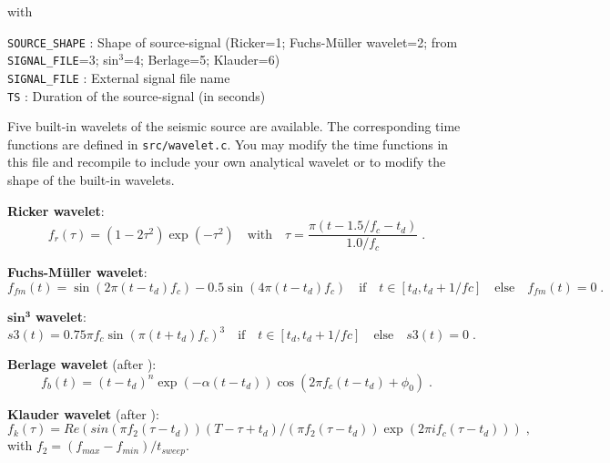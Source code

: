 with

\texttt{SOURCE\_SHAPE} : Shape of source-signal (Ricker=1; Fuchs-M\"uller wavelet=2; from \texttt{SIGNAL\_FILE}=3; sin$^3$=4; Berlage=5; Klauder=6)\\
\texttt{SIGNAL\_FILE} : External signal file name\\
\texttt{TS} : Duration of the source-signal (in seconds)

Five built-in wavelets of the seismic source are available. The corresponding time functions are defined in \texttt{src/wavelet.c}. You may modify the time functions in this file and recompile to include your own analytical wavelet or to modify the shape of the built-in wavelets.

\textbf{Ricker wavelet}:
\begin{equation}
    f_r(\tau)=\left(1-2\tau^2\right)\exp(- \tau^2) \quad \mbox{with} \quad \tau=\frac{\pi(t-1.5/f_c-t_d)}{1.0/f_c}\;. 
    \label{eq_ricker}
\end{equation}

\textbf{Fuchs-M\"uller wavelet}:
\begin{equation}
    f_{fm}(t) =\sin(2\pi(t-t_d)f_c)-0.5\sin(4\pi(t-t_d)f_c) \quad \mbox{if} \quad t\in[t_d,t_d+1/fc] \quad \mbox{else} \quad f_{fm}(t) =0\;.
    \label{eq_fm}
\end{equation}

$\mathbf{sin^3}$ \textbf{wavelet}:
\begin{equation}
    s3(t)=0.75 \pi f_c \sin(\pi(t+t_d)f_c)^3\quad \mbox{if} \quad t \in[t_d,t_d+1/fc] \quad \mbox{else} \quad s3(t)=0\;.
\label{eq_s3}
\end{equation}

\textbf{Berlage wavelet} (after \cite{aldrige:90}):
\begin{equation}
    f_b(t)=(t-t_d)^n \exp(- \alpha (t-t_d)) \cos(2 \pi f_c (t-t_d) + \phi_0)\;.
    \label{eq_berlage}
\end{equation}

\textbf{Klauder wavelet} (after \cite{neelima:18}):
\begin{equation}
    f_k(\tau) = \textit{Re}(sin(\pi f_2 (\tau-t_d)) (T-\tau+t_d)/(\pi f_2 (\tau-t_d))\exp(2 \pi i f_c (\tau-t_d)))\;,
    \label{eq_klauder}
\end{equation}
with $f_2=(f_{max}-f_{min})/t_{sweep}$.

